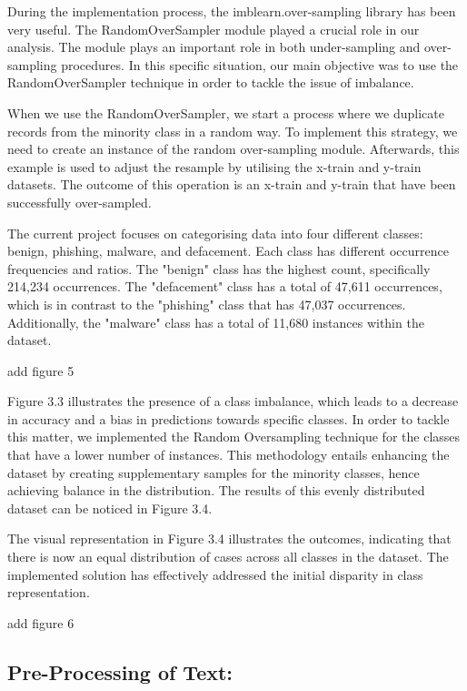 During the implementation process, the imblearn.over-sampling library has been very useful. The RandomOverSampler module played a crucial role in our analysis. The module plays an important role in both under-sampling and over-sampling procedures. In this specific situation, our main objective was to use the RandomOverSampler technique in order to tackle the issue of imbalance.

When we use the RandomOverSampler, we start a process where we duplicate records from the minority class in a random way. To implement this strategy, we need to create an instance of the random over-sampling module. Afterwards, this example is used to adjust the resample by utilising the x-train and y-train datasets. The outcome of this operation is an x-train and y-train that have been successfully over-sampled.

The current project focuses on categorising data into four different classes: benign, phishing, malware, and defacement. Each class has different occurrence frequencies and ratios. The "benign" class has the highest count, specifically 214,234 occurrences. The "defacement" class has a total of 47,611 occurrences, which is in contrast to the "phishing" class that has 47,037 occurrences. Additionally, the "malware" class has a total of 11,680 instances within the dataset.

add figure 5



Figure 3.3 illustrates the presence of a class imbalance, which leads to a decrease in accuracy and a bias in predictions towards specific classes. In order to tackle this matter, we implemented the Random Oversampling technique for the classes that have a lower number of instances. This methodology entails enhancing the dataset by creating supplementary samples for the minority classes, hence achieving balance in the distribution. The results of this evenly distributed dataset can be noticed in Figure 3.4.

The visual representation in Figure 3.4 illustrates the outcomes, indicating that there is now an equal distribution of cases across all classes in the dataset. The implemented solution has effectively addressed the initial disparity in class representation.

add figure 6


\newpage
\subsection{ Pre-Processing of Text:}

